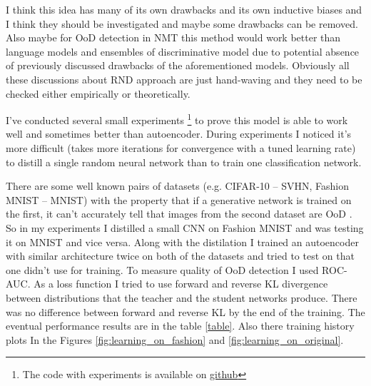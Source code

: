 \documentclass{article}
\begin{document}
    I think this idea has many of its own drawbacks and its own inductive biases and I think they should be investigated and maybe some drawbacks can be removed. Also maybe for OoD detection in NMT this method would work better than language models and ensembles of discriminative model due to potential absence of previously discussed drawbacks of the aforementioned models. Obviously all these discussions about RND approach are just hand-waving and they need to be checked either empirically or theoretically.

    I've conducted several small experiments \footnote{The code with experiments is available on \href{https://github.com/MichaelSolotky/sandbox/tree/master/Machine\_Learning/Random\_network\_distilation}{github}} to prove this model is able to work well and sometimes better than autoencoder. During experiments I noticed it's more difficult (takes more iterations for convergence with a tuned learning rate) to distill a single random neural network than to train one classification network.

    There are some well known pairs of datasets (e.g. CIFAR-10 -- SVHN, Fashion MNIST -- MNIST) with the property that if a generative network is trained on the first, it can't accurately tell that images from the second dataset are OoD \cite{do_dont_know, norm_flows_fail}. So in my experiments I distilled a small CNN on Fashion MNIST and was testing it on MNIST and vice versa. Along with the distilation I trained an autoencoder with similar architecture twice on both of the datasets and tried to test on that one didn't use for training. To measure quality of OoD detection I used ROC-AUC. As a loss function I tried to use forward and reverse KL divergence between distributions that the teacher and the student networks produce. There was no difference between forward and reverse KL by the end of the training. The eventual performance results are in the table \ref{table}. Also there training history plots In the Figures \ref{fig:learning_on_fashion} and \ref{fig:learning_on_original}.
\end{document}

